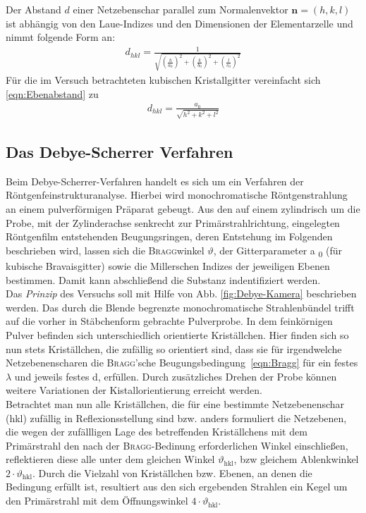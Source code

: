 \documentclass[a4paper,twoside,final]{article}
\begin{document}
Der Abstand $d$ einer Netzebenschar parallel zum Normalenvektor $\bm{n}=(h,k,l)$ ist abhängig von den Laue-Indizes und den Dimensionen der Elementarzelle und nimmt folgende Form an:
\begin{align}
  d_{hkl} = \frac{1}{\sqrt{\left(\frac{h}{a_0}\right)^2+\left(\frac{k}{b_0}\right)^2+\left(\frac{l}{c_0}\right)^2}}\label{eqn:Ebenabstand}
\end{align}
Für die im Versuch betrachteten kubischen Kristallgitter vereinfacht sich \eqref{eqn:Ebenabstand} zu
\begin{align}
  d_{hkl} = \frac{a_0}{\sqrt{h^2+k^2+l^2}}\label{eqn:Abstand_kubisch}
\end{align}

\subsection{Das Debye-Scherrer Verfahren}\label{sec:Verfahren}
Beim Debye-Scherrer-Verfahren handelt es sich um ein Verfahren der Röntgenfeinstrukturanalyse. Hierbei wird monochromatische Röntgenstrahlung an einem pulverförmigen Präparat gebeugt. Aus den auf einem zylindrisch um die Probe, mit der Zylinderachse senkrecht zur Primärstrahlrichtung, eingelegten Röntgenfilm entstehenden Beugungsringen, deren Entstehung im Folgenden beschrieben wird, lassen sich die \textsc{Bragg}winkel $\vartheta$, der Gitterparameter a \textsubscript{0} (für kubische Bravaisgitter) sowie die Millerschen Indizes der jeweiligen Ebenen bestimmen. Damit kann abschließend die Substanz indentifiziert werden.\\
Das \textit{Prinzip} des Versuchs soll mit Hilfe von Abb. \ref{fig:Debye-Kamera} beschrieben werden. Das durch die Blende begrenzte monochromatische Strahlenbündel trifft auf die vorher in Stäbchenform gebrachte Pulverprobe. In dem feinkörnigen Pulver befinden sich unterschiedlich orientierte Kriställchen. Hier finden sich so nun stets Kriställchen, die zufällig so orientiert sind, dass sie für irgendwelche Netzebenenscharen die \textsc{Bragg}'sche Beugungsbedingung~\eqref{eqn:Bragg} für ein festes $\lambda$ und jeweils festes d, erfüllen. Durch zusätzliches Drehen der Probe können weitere Variationen der Kistallorientierung erreicht werden.\\
Betrachtet man nun alle Kriställchen, die für eine bestimmte Netzebenenschar (hkl) zufällig in Reflexionsstellung sind bzw. anders formuliert die Netzebenen, die wegen der zufällligen Lage des betreffenden Kriställchens mit dem Primärstrahl den nach der \textsc{Bragg}-Bedinung erforderlichen Winkel einschließen, reflektieren diese alle unter dem gleichen Winkel $\vartheta_\text{hkl}$, bzw gleichem Ablenkwinkel $2\cdot\vartheta_\text{hkl}$. Durch die Vielzahl von Kriställchen bzw. Ebenen, an denen die Bedingung erfüllt ist, resultiert aus den sich ergebenden Strahlen ein Kegel um den Primärstrahl mit dem Öffnungswinkel $4\cdot\vartheta_\text{hkl}$. \\
\end{document}
